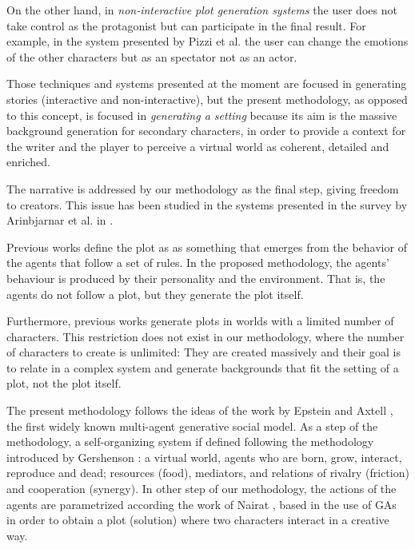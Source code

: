 \documentclass[letterpaper]{article}
\begin{document}
On the other hand, in {\em non-interactive plot generation systems} the user
does not take control as the protagonist but can participate in the final result. For example, in the system
presented by Pizzi et al. \cite{pizzi2007interactive} the user can change the emotions of the other characters but as an spectator not as an actor.

Those techniques and systems presented at the moment are focused in generating stories (interactive and non-interactive), but the present methodology, as opposed to this concept, is focused in \textit{generating a setting}
because its aim is the massive background generation
for secondary characters, in order to provide a context for the writer and the
player to perceive a virtual world as coherent, detailed and
enriched.

The narrative is addressed by our methodology as the final step, giving freedom to creators. This issue has been studied in the systems presented in
the survey by Arinbjarnar et al. in \cite{ReviewArinbjarnar09}. 

Previous works define the plot as as something that emerges from the behavior of the agents that follow a set of rules. In the proposed methodology, the agents' behaviour is produced by their personality and the environment. That is, the agents do not follow a plot, but they generate the plot itself.

Furthermore,  previous works generate plots in worlds with a limited number of characters. This restriction does not exist in our methodology, where the number of characters to create is unlimited: They are created massively and their goal is to relate in a complex system and generate backgrounds that fit the setting of a plot, not the plot itself.

The present methodology follows the ideas of the work by Epstein and Axtell
\cite{epstein1996growing}, 
the first widely known multi-agent generative social model. As a step of the methodology, a self-organizing system if defined following the methodology introduced by Gershenson
\cite{gershenson2005general}: a virtual world, agents who are born, grow, 
interact, reproduce and dead; resources (food), mediators, and
relations of rivalry (friction) and cooperation (synergy). In other step of our methodology, the actions of the agents are parametrized according the work of Nairat
\cite{nairat2011character}, based in the use of GAs in order to
obtain a plot (solution) where two characters interact in a creative way.
\end{document}

